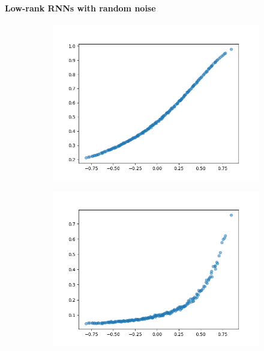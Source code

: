\documentclass[11pt]{article}
\begin{document}
	\paragraph{Low-rank RNNs with random noise}
		\begin{figure}[H]
			\centering
			\begin{subfigure}[b]{0.45\textwidth}
				\centering
				\includegraphics[width=\textwidth]{../figures/ttc_low_rank_sym_with_noise.png}
				\caption{}
			\end{subfigure}
			\begin{subfigure}[b]{0.45\textwidth}
				\centering
				\includegraphics[width=\textwidth]{../figures/its_low_rank_sym_with_noise.png}

\end{subfigure}
\end{figure}
\end{document}
